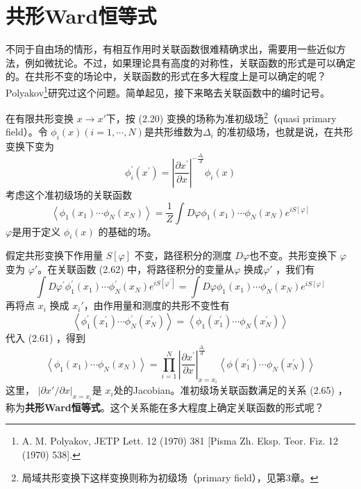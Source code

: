 \section{共形Ward恒等式}
不同于自由场的情形，有相互作用时关联函数很难精确求出，需要用一些近似方法，例如微扰论。不过，如果理论具有高度的对称性，关联函数的形式是可以确定的。在共形不变的场论中，关联函数的形式在多大程度上是可以确定的呢？Polyakov\footnote{A. M. Polyakov, JETP Lett. 12 (1970) 381 [Pisma Zh. Eksp. Teor. Fiz. 12 (1970) 538].}研究过这个问题。简单起见，接下来略去关联函数中的编时记号。

在有限共形变换 $x\to x' $下，按 (2.20) 变换的场称为准初级场\footnote{局域共形变换下这样变换则称为初级场（primary field），见第3章。}（quasi primary field）。令 $\phi_i(x) (i=1,\cdots,N )$是共形维数为$ \Delta_i$ 的准初级场，也就是说，在共形变换下变为
\begin{equation}
	\phi_{i}^{\prime}\left(x^{\prime}\right)=\left|\frac{\partial x^{\prime}}{\partial x}\right|^{-\frac{\Delta_{i}}{d}} \phi_{i}(x)
\end{equation}
考虑这个准初级场的关联函数
\begin{equation}
	\left\langle\phi_{1}\left(x_{1}\right) \cdots \phi_{N}\left(x_{N}\right)\right\rangle=\frac{1}{Z} \int D \varphi \phi_{1}\left(x_{1}\right) \cdots \phi_{N}\left(x_{N}\right) e^{i S[\varphi]}
\end{equation}
$\varphi $是用于定义 $\phi_i(x)$ 的基础的场。

假定共形变换下作用量 $S[\varphi]$ 不变，路径积分的测度 $D\varphi $也不变。共形变换下 $\varphi$ 变为 $\varphi' $。在关联函数 (2.62) 中，将路径积分的变量从$ \varphi$ 换成$ \varphi'$ ，我们有
\begin{equation}
	\int D \varphi^{\prime} \phi_{1}^{\prime}\left(x_{1}\right) \cdots \phi_{N}^{\prime}\left(x_{N}\right) e^{i S\left[\varphi^{\prime}\right]}=\int D \varphi \phi_{1}\left(x_{1}\right) \cdots \phi_{N}\left(x_{N}\right) e^{i S[\varphi]}
\end{equation}
再将点 $x_i$ 换成 $x_i' $，由作用量和测度的共形不变性有
\begin{equation}
	\left\langle\phi_{1}^{\prime}\left(x_{1}^{\prime}\right) \cdots \phi_{N}^{\prime}\left(x_{N}^{\prime}\right)\right\rangle=\left\langle\phi_{1}\left(x_{1}^{\prime}\right) \cdots \phi_{N}\left(x_{N}^{\prime}\right)\right\rangle
\end{equation}
代入 (2.61) ，得到
\begin{equation}
	\left\langle\phi_1\left(x_{1}\right) \cdots \phi_{N}\left(x_{N}\right)\right\rangle=\prod_{i=1}^{N}\left|\frac{\partial x^{\prime}}{\partial x}\right|_{x=x_{i}}^{\frac{\Delta_{i}}{d}}\left\langle\phi\left(x_{1}^{\prime}\right) \cdots \phi_{N}\left(x_{N}^{\prime}\right)\right\rangle
\end{equation}
这里， $|\partial x'/\partial x|_{x=x_i} $是 $x_i $处的Jacobian。准初级场关联函数满足的关系 (2.65) ，称为\textbf{共形Ward恒等式}。这个关系能在多大程度上确定关联函数的形式呢？

